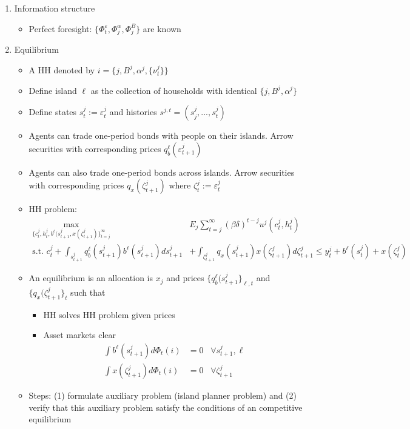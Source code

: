 \documentclass{article}
\begin{document}
\begin{enumerate}
\item Information structure

\begin{itemize}
\item Perfect foresight: $\{ \Phi_t^\varepsilon, \Phi_j^\alpha, \Phi_j^B \}$ are known
\end{itemize}


\item Equilibrium

\begin{itemize}
\item A HH denoted by $i = \{j, B^j, \alpha^j, \{ \nu_t^j \}\}$
\item Define island $\ell$ as the collection of households with identical $\{j, B^j, \alpha^j\}$
\item Define states $s_t^j := \varepsilon_t^j$ and histories $s^{j,t} = (s_j^j, ..., s_t^j)$
\item Agents can trade one-period bonds with people on their islands. Arrow securities with corresponding prices $q_b^\ell(\varepsilon_{t+1}^j)$
\item Agents can also trade one-period bonds across islands. Arrow securities with corresponding prices $q_x(\zeta_{t+1}^j)$  where $\zeta_t^j := \varepsilon_t^j$
\item HH problem:
\begin{align*}
\max_{\{c_t^j, h_t^j, b^\ell(s_{t+1}^j, x (\zeta_{t+1}^j)\}_{t=j}^\infty} & E_j \sum_{t=j}^\infty (\beta \delta)^{t-j} u^j(c_t^j, h_t^j)\\
\text{s.t. } c_t^j + \int_{s_{t+1}^j} q_b^\ell(s_{t+1}^j) b^\ell(s_{t+1}^j) ds_{t+1}^j &+ \int_{\zeta_{t+1}^j} q_x(s_{t+1}^j) x(\zeta_{t+1}^j) d\zeta_{t+1}^j \le y_t^j + b^\ell(s_t^j) + x(\zeta_t^j)
\end{align*}
\item An equilibrium is an allocation is $x_j$ and prices $\{q_b^\ell(s_{t+1}^j\}_{\ell, t}$ and $\{q_x(\zeta_{t+1}^j\}_t$ such that
\begin{itemize}
\item HH solves HH problem given prices
\item Asset markets clear
\begin{align*}
\int b^\ell(s_{t+1}^j) d \Phi_t(i) &= 0 \;\;\; \forall s_{t+1}^j, \ell\\
\int x(\zeta_{t+1}^j) d \Phi_t(i) &= 0 \;\;\; \forall \zeta_{t+1}^j
\end{align*}
\end{itemize}
\item Steps: (1) formulate auxiliary problem (island planner problem) and (2) verify that this auxiliary problem satisfy the conditions of an competitive equilibrium
\end{itemize}


\end{enumerate}
\end{document}
